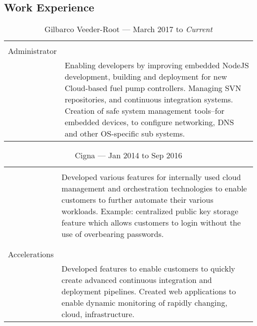 \documentclass[letterpaper,]{article}
\begin{document}
\subsection{Work Experience}\label{work-experience}

\begin{table}[!ht]
\centering
    \caption{Gilbarco Veeder-Root --- March 2017 to \emph{Current}}
    \begin{tabularx}{\textwidth}{r|X}
        \begin{tabular}{@{}r@{}} %
            System \\
            Administrator\\
        \end{tabular}
        & Enabling developers by improving embedded NodeJS development,
        building and deployment for new Cloud-based fuel pump controllers.
        Managing SVN repositories, and continuous integration systems.
        Creation of safe system management tools--for embedded devices, 
        to configure networking, DNS and other OS-specific sub systems. \\
    \end{tabularx}
\end{table}

\begin{table}[!ht]
\centering
    \caption{Cigna --- Jan 2014 to Sep 2016}
    \begin{tabularx}{\textwidth}{r|X}
        \begin{tabular}{@{}r@{}}
            Private Cloud \\
        \end{tabular}
        & Developed various features for
        internally used cloud management and orchestration technologies 
        to enable customers to further automate their various workloads. 
        Example: centralized public key storage feature which 
        allows customers to login without the use of overbearing passwords. \\
        & \\
        \begin{tabular}{@{}r@{}}
            Delivery \\
            Accelerations \\
        \end{tabular}
        & Developed features to enable customers to quickly 
        create advanced continuous integration and deployment pipelines. 
        Created web applications to enable dynamic monitoring of rapidly
        changing, cloud, infrastructure.
    \end{tabularx}
\end{table}
\end{document}
